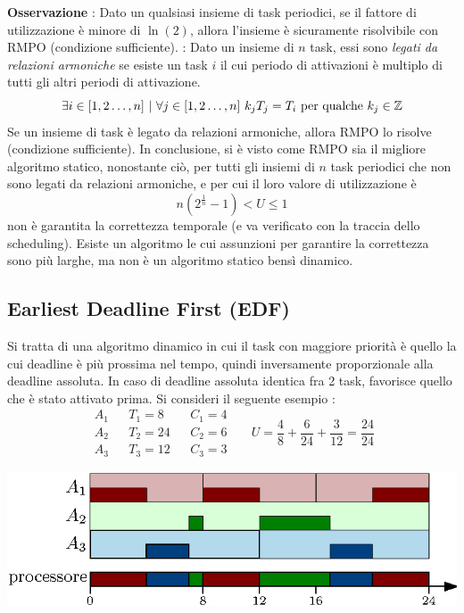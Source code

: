 \documentclass[10pt, letterpaper]{report}
\begin{document}
\textbf{Osservazione} : Dato un qualsiasi insieme di task periodici, se il fattore di 
utilizzazione è minore di $\ln(2)$, allora l'insieme è sicuramente risolvibile con RMPO (condizione 
sufficiente).\acc
{} : Dato un insieme di $n$ task, essi sono \textit{legati da relazioni 
armoniche} se esiste un task $i$ il cui periodo di attivazioni è multiplo di tutti gli altri 
periodi di attivazione.
$$ \exists i\in[1,2\dots,n] \ | \ \forall j\in[1,2\dots,n] \  k_j T_j=T_i \text{ per qualche }k_j\in\Z$$ 
 Se un insieme di task è legato da relazioni armoniche, allora RMPO lo risolve (condizione 
sufficiente).\acc 
In conclusione, si è visto come RMPO sia il migliore algoritmo statico, nonostante ciò, per 
tutti gli insiemi di $n$ task periodici che non sono legati da relazioni armoniche, e per cui 
il loro valore di utilizzazione è $$ n(2^{\frac{1}{n}}-1)<U\le 1$$
non è garantita la correttezza temporale (e va verificato con la traccia dello scheduling). 
Esiste un algoritmo le cui assunzioni per garantire la correttezza sono più larghe, ma non è 
un algoritmo statico bensì dinamico.
\subsection{Earliest Deadline First (EDF)}
Si tratta di una algoritmo dinamico in cui il task con maggiore priorità è 
quello la cui deadline è più prossima nel tempo, quindi inversamente 
proporzionale alla deadline assoluta. In caso di deadline 
assoluta identica fra 2 task, favorisce quello che è 
stato attivato prima. Si consideri il seguente esempio : 
$$\begin{matrix}
    A_1&&T_1=8&&C_1=4\\ 
    A_2&&T_2=24&&C_2=6\\ 
    A_3&&T_3=12&&C_3=3
\end{matrix}  \ \ \ \ \ \ \ U=\frac{4}{8}+\frac{6}{24}+\frac{3}{12}=\frac{24}{24}$$\begin{center}
    \includegraphics[width=1\textwidth ]{images/EsempioEDF.eps}
\end{center}
\end{document}
